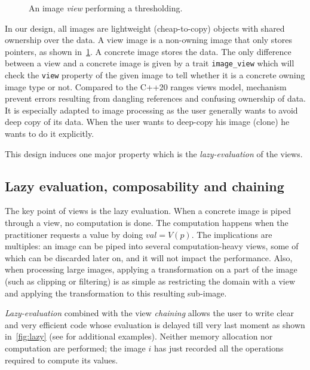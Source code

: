 \begin{figure}[htbp]
  \centering
  \begin{minipage}{\linewidth}
    
  \end{minipage}
  \caption{An image \emph{view} performing a thresholding.}
  \label{fig:view.threshold}
\end{figure}

In our design, all images are lightweight (cheap-to-copy) objects with shared ownership over the data. A view image is a
non-owning image that only stores pointers, as shown in~\cref{fig:view.threshold}. A concrete image stores the data. The
only difference between a view and a concrete image is given by a trait \texttt{image\_view} which will check the
\texttt{view} property of the given image to tell whether it is a concrete owning image type or not. Compared to the
C++20 ranges views model, mechanism prevent errors resulting from dangling references and confusing ownership of data.
It is especially adapted to image processing as the user generally wants to avoid deep copy of its data. When the user
wants to deep-copy his image (clone) he wants to do it explicitly.

This design induces one major property which is the \emph{lazy-evaluation} of the views.

\subsection{Lazy evaluation, composability and chaining}
\label{subsec:image.views.lazy.eval}

The key point of views is the lazy evaluation. When a concrete image is piped through a view, no computation is done.
The computation happens when the practitioner requests a value by doing \(val = V(p)\). The implications are multiples:
an image can be piped into several computation-heavy views, some of which can be discarded later on, and it will not
impact the performance. Also, when processing large images, applying a transformation on a part of the image (such as
clipping or filtering) is as simple as restricting the domain with a view and applying the transformation to this
resulting sub-image.

\emph{Lazy-evaluation} combined with the view \emph{chaining} allows the user to write clear and very efficient code
whose evaluation is delayed till very last moment as shown in~\cref{fig:lazy} (see \parencite{geraud.2018.gtgdmm} for
additional examples). Neither memory allocation nor computation are performed; the image \(i\) has just recorded all the
operations required to compute its values.

